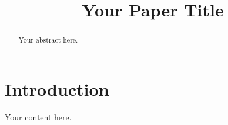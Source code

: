 \documentclass[conference]{IEEEtran}
\begin{document}
\title{Your Paper Title}
\author{}
\maketitle
\begin{abstract}
Your abstract here.
\end{abstract}
\section{Introduction}
Your content here.
\end{document}
